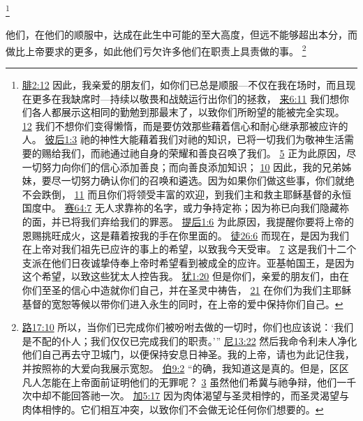 \documentclass[12pt, a4paper, oneside]{ctexart}
\newcounter{parnum}[section]
\newcommand{\N}{%
   \noindent\refstepcounter{parnum}%
    \makebox[\parindent][l]{\textbf{\arabic{parnum}.}}}
\begin{document}
	\footnote {
		\href{https://biblehub.com/philippians/2-12.htm}{腓2:12} 因此，我亲爱的朋友们，如你们已总是顺服---不仅在我在场时，而且现在更多在我缺席时---持续以敬畏和战兢运行出你们的拯救，
		\href{https://biblehub.com/hebrews/6-11.htm}{来6:11} 我们想你们各人都展示这相同的勤勉到那最末了，以致你们所盼望的能被完全实现。
		\href{https://biblehub.com/hebrews/6-12.htm}{12} 我们不想你们变得懒惰，而是要仿效那些藉着信心和耐心继承那被应许的人。
		\href{https://biblehub.com/2_peter/1-3.htm}{彼后1:3} 祂的神性大能藉着我们对祂的知识，已将一切我们为敬神生活需要的赐给我们，而祂通过祂自身的荣耀和善良召唤了我们。
		\href{https://biblehub.com/2_peter/1-5.htm}{5} 正为此原因，尽一切努力向你们的信心添加善良；而向善良添加知识；
		\href{https://biblehub.com/2_peter/1-10.htm}{10} 因此，我的兄弟姊妹，要尽一切努力确认你们的召唤和遴选。因为如果你们做这些事，你们就绝不会跌倒，
		\href{https://biblehub.com/2_peter/1-11.htm}{11} 而且你们将领受丰富的欢迎，到我们主和救主耶稣基督的永恒国度中。
		\href{https://biblehub.com/isaiah/64-7.htm}{赛64:7} 无人求靠祢的名字，或力争持定祢；因为祢已向我们隐藏祢的面，并已将我们弃给我们的罪恶。
		\href{https://biblehub.com/2_timothy/1-6.htm}{提后1:6} 为此原因，我提醒你要将上帝的恩赐挑旺成火，这是藉着按我的手在你里面的。
		\href{https://biblehub.com/acts/26-6.htm}{徒26:6} 而现在，是因为我们在上帝对我们祖先已应许的事上的希望，以致我今天受审。
		\href{https://biblehub.com/acts/26-7.htm}{7} 这是我们十二个支派在他们日夜诚挚侍奉上帝时希望看到被成全的应许。亚基帕国王，是因为这个希望，以致这些犹太人控告我。
		\href{https://biblehub.com/jude/1-20.htm}{犹1:20} 但是你们，亲爱的朋友们，由在你们至圣的信心中造就你们自己，并在圣灵中祷告，
		\href{https://biblehub.com/jude/1-21.htm}{21} 在你们为我们主耶稣基督的宽恕等候以带你们进入永生的同时，在上帝的爱中保持你们自己。
	}

\N 他们，在他们的顺服中，达成在此生中可能的至大高度，但远不能够超出本分，而做比上帝要求的更多，如此他们亏欠许多他们在职责上具责做的事。
	\footnote {
		\href{https://biblehub.com/luke/17-10.htm}{路17:10} 所以，当你们已完成你们被吩咐去做的一切时，你们也应该说：‘我们是不配的仆人；我们仅仅已完成我们的职责。’”
		\href{https://biblehub.com/nehemiah/13-22.htm}{尼13:22} 然后我命令利未人净化他们自己再去守卫城门，以便保持安息日神圣。我的上帝，请也为此记住我，并按照祢的大爱向我展示宽恕。
		\href{https://biblehub.com/job/9-2.htm}{伯9:2} “的确，我知道这是真的。但是，区区凡人怎能在上帝面前证明他们的无罪呢？
		\href{https://biblehub.com/job/9-3.htm}{3} 虽然他们希冀与祂争辩，他们一千次中却不能回答祂一次。
		\href{https://biblehub.com/galatians/5-17.htm}{加5:17} 因为肉体渴望与圣灵相悖的，而圣灵渴望与肉体相悖的。它们相互冲突，以致你们不会做无论任何你们想要的。
	}
\end{document}
